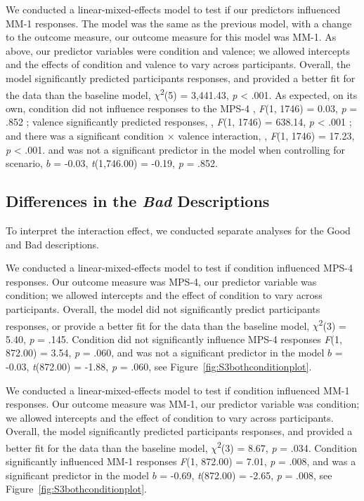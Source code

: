 \documentclass[
  english,
  man,floatsintext]{apa7}
\begin{document}
We conducted a linear-mixed-effects model to test if our predictors influenced MM-1 responses. The model was the same as the previous model, with a change to the outcome measure, our outcome measure for this model was MM-1. As above, our predictor variables were condition and valence; we allowed intercepts and the effects of condition and valence to vary across participants.
Overall, the model significantly predicted participants responses, and provided a better fit for the data than the baseline model,
\(\chi\)\textsuperscript{2}(5) = 3,441.43, \emph{p} \textless{} .001.
As expected, on its own, condition did not influence responses to the MPS-4
, \emph{F}(1, 1746) = 0.03, \emph{p} = .852
; valence significantly predicted responses,
, \emph{F}(1, 1746) = 638.14, \emph{p} \textless{} .001
; and there was a significant condition \(\times\) valence interaction,
, \emph{F}(1, 1746) = 17.23, \emph{p} \textless{} .001.
and was not a significant predictor in the model when controlling for scenario, \(b\) = -0.03, \emph{t}(1,746.00) = -0.19, \emph{p} = .852.

\hypertarget{differences-in-the-bad-descriptions}{%
\subsection{\texorpdfstring{Differences in the \emph{Bad} Descriptions}{Differences in the Bad Descriptions}}\label{differences-in-the-bad-descriptions}}

To interpret the interaction effect, we conducted separate analyses for the Good and Bad descriptions.

We conducted a linear-mixed-effects model to test if condition influenced MPS-4 responses. Our outcome measure was MPS-4, our predictor variable was condition; we allowed intercepts and the effect of condition to vary across participants. Overall, the model did not significantly predict participants responses, or provide a better fit for the data than the baseline model, \(\chi\)\textsuperscript{2}(3) = 5.40, \emph{p} = .145. Condition did not significantly influence MPS-4 responses \emph{F}(1, 872.00) = 3.54, \emph{p} = .060, and was not a significant predictor in the model \(b\) = -0.03, \emph{t}(872.00) = -1.88, \emph{p} = .060, see Figure~\ref{fig:S3bothconditionplot}.

We conducted a linear-mixed-effects model to test if condition influenced MM-1 responses. Our outcome measure was MM-1, our predictor variable was condition; we allowed intercepts and the effect of condition to vary across participants. Overall, the model significantly predicted participants responses, and provided a better fit for the data than the baseline model, \(\chi\)\textsuperscript{2}(3) = 8.67, \emph{p} = .034. Condition significantly influenced MM-1 responses \emph{F}(1, 872.00) = 7.01, \emph{p} = .008, and was a significant predictor in the model \(b\) = -0.69, \emph{t}(872.00) = -2.65, \emph{p} = .008, see Figure~\ref{fig:S3bothconditionplot}.
\end{document}
